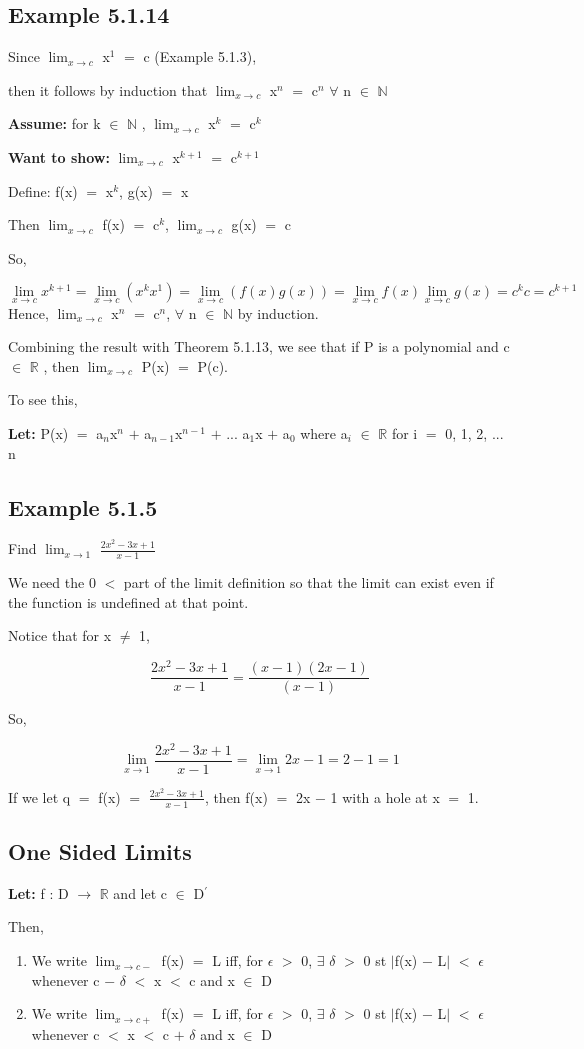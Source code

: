 \documentclass{article}
\newcommand{\mt}[1]{\ensuremath{#1}}
\newcommand\ssc[2][\DefaultOpt]{%
  \def\DefaultOpt{#2}%
  \subsection[#1]{#2}%
}
\newcommand{\elist}{\end{enumerate}}
\newcommand{\bilist}{\begin{enumerate}[label=\roman*)]}
\newcommand{\lt}[1]{\textbf{Let: } #1}
\newcommand{\wts}[1]{\textbf{Want to show: } #1}
\newcommand{\as}[1]{\textbf{Assume: } #1}
\newcommand{\br}{\mt{\mathbb{R}} }       %
\newcommand{\bn}{\mt{\mathbb{N}} }       %
\newcommand{\ep}{\mt{\epsilon} }         %
\newcommand{\fa}{\mt{\forall} }          %
\newcommand{\dta}{\mt{\delta} }
\newcommand{\mem}{\mt{\in} }
\newcommand{\exs}{\mt{\exists} }
\newcommand{\lra}{ \mt{\longrightarrow} } %
\newcommand{\av}[1]{\mt{|}#1\mt{|}}  %
\newcommand{\ps}{\mt{+} }
\newcommand{\ms}{\mt{-} }
\newcommand{\ls}{\mt{<} }
\newcommand{\gr}{\mt{>} }
\newcommand{\eql}{\mt{=} }
\newcommand{\pr}{\mt{^\prime} } 		   %
\newcommand{\uw}[2]{#1\mt{_{#2}}}
\newcommand{\uf}[2]{#1\mt{^{#2}}}
\newcommand{\frc}[2]{\mt{\frac{#1}{#2}}}
\newcommand{\limt}[2]{\mt{\displaystyle{\lim_{#1 \to #2}}}}
\newcommand{\eqn}[1]{\[#1\]}
\begin{document}
\ssc{Example 5.1.14}{

Since \limt{x}{c} \uf{x}{1} \eql c (Example 5.1.3),

then it follows by induction that \limt{x}{c} \uf{x}{n} \eql \uf{c}{n} \fa n \mem \bn

\as{for k \mem \bn, \limt{x}{c} \uf{x}{k} \eql \uf{c}{k}}

\wts{\limt{x}{c} \uf{x}{k + 1} \eql \uf{c}{k + 1}}

Define: f(x) \eql \uf{x}{k}, g(x) \eql x

Then \limt{x}{c} f(x) \eql \uf{c}{k}, \limt{x}{c} g(x) \eql c

So,

\eqn{\limt{x}{c} \uf{x}{k + 1} \eql \limt{x}{c} (\uf{x}{k} \uf{x}{1}) = \limt{x}{c} (f(x) g(x)) = \limt{x}{c} f(x) \limt{x}{c} g(x) = c^k c = c^{k + 1}}
Hence, \limt{x}{c} \uf{x}{n} \eql \uf{c}{n}, \fa n \mem \bn by induction.

Combining the result with Theorem 5.1.13, we see that if P is a polynomial and c \mem \br, then \limt{x}{c} P(x) \eql P(c).

To see this,

\lt{P(x) \eql \uw{a}{n}\uf{x}{n} \ps \uw{a}{n - 1}\uf{x}{n - 1} \ps ... \uw{a}{1}x \ps \uw{a}{0} where \uw{a}{i} \mem \br for i \eql 0, 1, 2, ... n}

\ssc{Example 5.1.5}{

Find \limt{x}{1} \frc{2x^2 - 3x + 1}{x - 1}

We need the 0 \ls part of the limit definition so that the limit can exist even if the function is undefined at that point.

Notice that for x $\neq$ 1,

\eqn{\frac{2x^2 - 3x + 1}{x - 1} = \frac{(x - 1)(2x - 1)}{(x - 1)}}

So,

\eqn{\limt{x}{1} \frac{2x^2 - 3x + 1}{x - 1} = \limt{x}{1} 2x - 1 = 2 - 1 = 1}

If we let q \eql f(x) \eql \frc{2x^2 - 3x + 1}{x - 1}, then f(x) \eql 2x \ms 1 with a hole at x \eql 1.
}

\ssc{One Sided Limits}{

\lt{f : D \lra \br and let c \mem D\pr}

Then,

\bilist
\item We write \limt{x}{c-} f(x) \eql L iff, for \ep \gr 0, \exs \dta \gr 0 st \av{f(x) \ms L} \ls \ep whenever c \ms \dta \ls x \ls c and x \mem D
\item We write \limt{x}{c+} f(x) \eql L iff, for \ep \gr 0, \exs \dta \gr 0 st \av{f(x) \ms L} \ls \ep whenever c \ls x \ls c \ps \dta and x \mem D
\elist

}}
\end{document}
